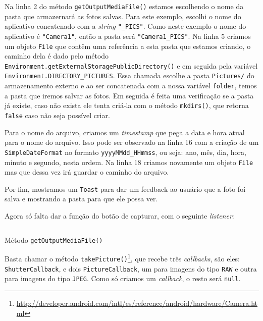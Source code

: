 \documentclass[a4paper,12pt,brazil,oneside]{book}
\begin{document}
		Na linha 2 do método \texttt{getOutputMediaFile()} estamos escolhendo o nome da pasta que armazernará as fotos salvas. Para este exemplo, escolhi o nome do aplicativo concatenado com a \emph{string} \texttt{"\_PICS"}. Como neste exemplo o nome do aplicativo é \texttt{"Camera1"}, então a pasta será \texttt{"Camera1\_PICS"}. Na linha 5 criamos um objeto \texttt{File} que contêm uma referência a esta pasta que estamos criando, o caminho dela é dado pelo método \\ \texttt{Environment.getExternalStoragePublicDirectory()} e em seguida pela variável \texttt{Environment.DIRECTORY\_PICTURES}. Essa chamada escolhe a pasta \texttt{Pictures/} do armazenamento externo e ao ser concatenada com a nossa variável \texttt{folder}, temos a pasta que iremos salvar as fotos. Em seguida é feita uma verificação se a pasta já existe, caso não exista ele tenta criá-la com o método \texttt{mkdirs()}, que retorna \texttt{false} caso não seja possível criar.

		Para o nome do arquivo, criamos um \emph{timestamp} que pega a data e hora atual para o nome do arquivo. Isso pode ser observado na linha 16 com a criação de um \texttt{SimpleDateFormat} no formato \texttt{yyyyMMdd\_HHmmss}, ou seja: ano, mês, dia, hora, minuto e segundo, nesta ordem. Na linha 18 criamos novamente um objeto \texttt{File} mas que dessa vez irá guardar o caminho do arquivo. 

		Por fim, mostramos um \texttt{Toast} para dar um feedback ao usuário que a foto foi salva e mostrando a pasta para que ele possa ver. 

		Agora só falta dar a função do botão de capturar, com o seguinte \emph{listener}:

		\begin{listing}[H]
		\inputminted[linenos=true,fontsize=\small,frame=lines, framesep=2mm, tabsize=2,numbersep=5pt]{java}{src/api/camera/takepic.java}
		\caption{Método \texttt{getOutputMediaFile()}}
		\label{code:camera-takepic}
		\end{listing} 			

		Basta chamar o método \texttt{takePicture()}\footnote{\href{http://developer.android.com/intl/es/reference/android/hardware/Camera.html}{http://developer.android.com/intl/es/reference/android/hardware/Camera.html}}, que recebe três \emph{callbacks}, são eles: \\ \texttt{ShutterCallback}, e dois \texttt{PictureCallback}, um para imagens do tipo \texttt{RAW} e outra para imagens do tipo \texttt{JPEG}. Como só criamos um \emph{callback}, o resto será \texttt{null}.
		
\end{document}

